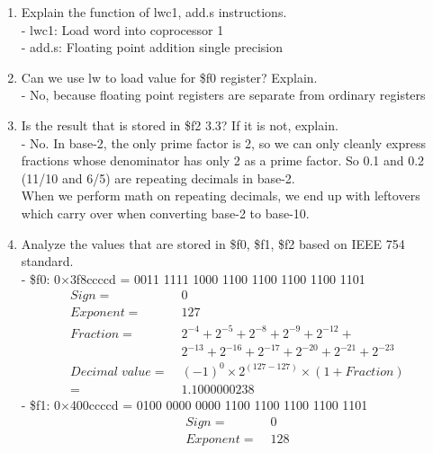 \documentclass[12pt,a4paper]{article}
\begin{document}
\begin{enumerate}
  \item Explain the function of lwc1, add.s instructions. \\
        - lwc1: Load word into coprocessor 1 \\
        - add.s: Floating point addition single precision
  \item Can we use lw to load value for \$f0 register? Explain. \\
        - No, because floating point registers are separate from ordinary registers
  \item Is the result that is stored in \$f2 3.3? If it is not, explain. \\
        - No. In base-2, the only prime factor is 2, so we can only cleanly express fractions whose denominator has only 2 as a prime factor.
        So 0.1 and 0.2 (11/10 and 6/5) are repeating decimals in base-2. \\
        When we perform math on repeating decimals, we end up with leftovers which carry over when converting base-2 to base-10.
  \item Analyze the values that are stored in \$f0, \$f1, \$f2 based on IEEE 754 standard. \\
        - \$f0: 0\(\times\)3f8ccccd = 0011 1111 1000 1100 1100 1100 1100 1101
        \begin{align*}
          Sign           = & \;0                                                         \\
          Exponent       = & \;127                                                       \\
          Fraction       = & \;2^{-4} + 2^{-5} + 2^{-8} + 2^{-9} + 2^{-12}  +            \\
                           & \;2^{-13} + 2^{-16} + 2^{-17} + 2^{-20} + 2^{-21} + 2^{-23} \\
          Decimal\;value = & \;{(-1)}^{0} \times 2^{(127 - 127)} \times (1 + Fraction)   \\
          =                & \;1.1000000238
        \end{align*}
        - \$f1: 0\(\times\)400ccccd = 0100 0000 0000 1100 1100 1100 1100 1101
        \begin{align*}
          Sign           = & \;0                                                         \\
          Exponent       = & \;128                                                       \\

\end{align*}
\end{enumerate}
\end{document}

